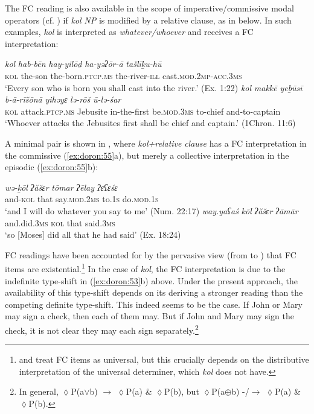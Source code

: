 \documentclass[output=paper]{langsci/langscibook}
\begin{document}
The FC reading is also available in the scope of imperative/commissive modal operators (cf. \citealt{Dayal2013}) if \textit{kol} \textit{NP} is modified by a relative clause, as in  below. In such examples, \textit{kol} is interpreted as \textit{whatever/whoever} and receives a FC interpretation:

\ea%
    \label{ex:doron:54}
    \ea
    \gll \textit{kol}   \textit{hab-bēn} \textit{hay-yilōḏ}                 \textit{ha-yəʔōr-ā}     \textit{tašlīḵu-hū}\\
         \textsc{kol} the-son  the-born.\textsc{ptcp.ms}  the-river-\textsc{ill}  cast.\textsc{mod.2mp-acc.3ms} \\
    \glt `Every son who is born you shall cast into the river.' (Ex. 1:22)
    \ex
    \gll \textit{kol}   \textit{makkē}                 \textit{yeḇūsī}    \textit{b-ā-rīšōnā}     \textit{yihǝyɛ}            \textit{lə-rōš}     \textit{ū-lə-śar}\\
         \textsc{kol} attack.\textsc{ptcp.ms}  Jebusite  in-the-first  be.\textsc{mod.3ms} to-chief  and-to-captain\\
    \glt `Whoever attacks the Jebusites first shall be\textsuperscript{} chief and captain.' (1Chron. 11:6)
    \z
\z

A minimal pair is shown in , where \textit{kol+relative} \textit{clause} has a FC interpretation in the commissive (\ref{ex:doron:55}a), but merely a collective interpretation in the episodic (\ref{ex:doron:55}b):

\ea%
    \label{ex:doron:55}
    \ea
    \gll \textit{wə-ḵōl}     \textit{ʔăšɛr}  \textit{tōmar}               \textit{ʔēlay}     \textit{ʔɛʕɛśɛ}\\
         and-\textsc{kol}  that    say.\textsc{mod}.\textsc{2ms}   to.\textsc{1s}     do.\textsc{mod.1s}\\
    \glt `and I will do whatever you say to me' (Num. 22:17)
    \ex
    \gll \textit{way.yaʕaś}      \textit{kōl}   \textit{ʔăšɛr}  \textit{ʔāmār} \\
         and.did.\textsc{3ms}   \textsc{kol} that     said.\textsc{3ms}\\
    \glt `so [Moses] did all that he had said' (Ex. 18:24)
    \z
\z

FC readings have been accounted for by the pervasive view (from \citealt{KadmonLandman1993} to \citealt{Chierchia2013}) that FC items are existential.\footnote{\citet{Benito2010} and \citet{Zimmermann2008} treat FC items as universal, but this crucially depends on the distributive interpretation of the universal determiner, which \textit{kol} does not have.} In the case of \textit{kol}, the FC interpretation is due to the indefinite type-shift in (\ref{ex:doron:53}b) above. Under the present approach, the availability of this type-shift depends on its deriving a stronger reading than the competing definite type-shift. This indeed seems to be the case. If John or Mary may sign a check, then each of them may. But if John and Mary may sign the check, it is not clear they may each sign separately.\footnote{ \textrm{In general, ${\lozenge}$P(a${\vee}$b) ${\rightarrow}$  ${\lozenge}$P(a) \& ${\lozenge}$P(b), but  ${\lozenge}$P(a${\oplus}$}b) -/\textrm{${\rightarrow}$} ${\lozenge}$P(a) \& ${\lozenge}$P(b).}
\end{document}
